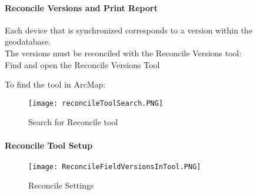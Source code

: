  \clearpage


 \paragraph{Reconcile Versions and Print Report}


 \vspace{.25in}

 Each device that is synchronized corresponds to a version within the geodatabase.\\

 \noindent The versions must be reconciled with the Reconcile Versions tool:\\
  
 \noindent Find and open the Reconcile Versions Tool
  
 \noindent To find the tool {\LARGE in ArcMap:}\\


   \begin{figure}[h!]
   
     \texttt{[image: reconcileToolSearch.PNG]}
 \caption{Search for Reconcile tool}
 
\end{figure}


 \clearpage


 \paragraph{Reconcile Tool Setup}


 \vspace{.2in}





 \vspace{.1in}


 \begin{figure}[h!]
 \centering
     \texttt{[image: ReconcileFieldVersionsInTool.PNG]}
 \caption{Reconcile Settings}

\end{figure}


 
  \vspace{.3in}



